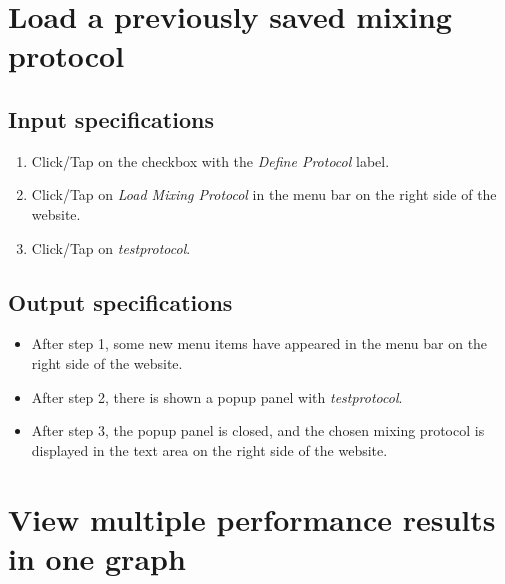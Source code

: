 \section{Load a previously saved mixing protocol}

\subsection*{Input specifications}
\begin{enumerate}
\item Click/Tap on the checkbox with the \emph{Define Protocol} label.
\item Click/Tap on \emph{Load Mixing Protocol} in the menu bar on the right side of the website.
\item Click/Tap on \emph{testprotocol}.
\end{enumerate}

\subsection*{Output specifications}
\begin{itemize}
\item After step 1, some new menu items have appeared in the menu bar on the right side of the website.
\item After step 2, there is shown a popup panel with \emph{testprotocol}.
\item After step 3, the popup panel is closed, and the chosen mixing protocol is displayed in the text area on the right side of the website.
\end{itemize}

\section{View multiple performance results in one graph}

